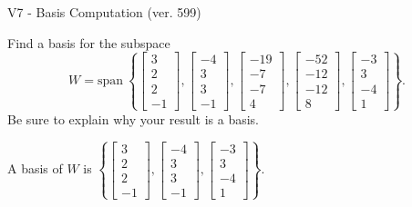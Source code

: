 \begin{exercise}
  \begin{exerciseTitle}V7 - Basis Computation (ver. 599)\end{exerciseTitle}
  \begin{exerciseStatement}
    Find a basis for the subspace 
\[W=\mathrm{span}\ \left\{\left[\begin{array}{r}
3 \\
2 \\
2 \\
-1
\end{array}\right] , \left[\begin{array}{r}
-4 \\
3 \\
3 \\
-1
\end{array}\right] , \left[\begin{array}{r}
-19 \\
-7 \\
-7 \\
4
\end{array}\right] , \left[\begin{array}{r}
-52 \\
-12 \\
-12 \\
8
\end{array}\right] , \left[\begin{array}{r}
-3 \\
3 \\
-4 \\
1
\end{array}\right]\right\}.\]
 Be sure to explain why your result is a basis.


  \end{exerciseStatement}
  \begin{exerciseAnswer}
   A basis of \(W\) is  \(\left\{\left[\begin{array}{r}
3 \\
2 \\
2 \\
-1
\end{array}\right] , \left[\begin{array}{r}
-4 \\
3 \\
3 \\
-1
\end{array}\right] , \left[\begin{array}{r}
-3 \\
3 \\
-4 \\
1
\end{array}\right]\right\}\).
  


  \end{exerciseAnswer}
\end{exercise}